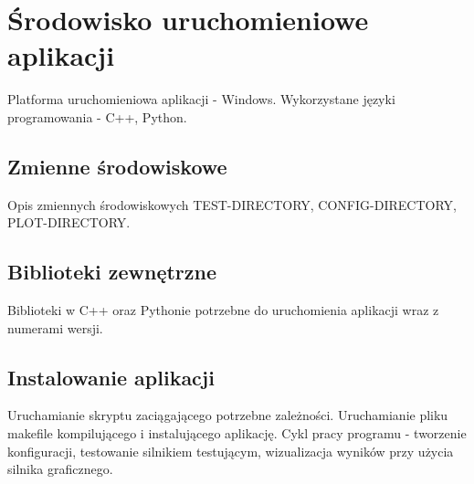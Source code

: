 \chapter{Środowisko uruchomieniowe aplikacji}
\thispagestyle{chapterBeginStyle}
Platforma uruchomieniowa aplikacji - Windows. Wykorzystane języki programowania - C++, Python.

\section{Zmienne środowiskowe}
Opis zmiennych środowiskowych TEST-DIRECTORY, CONFIG-DIRECTORY, PLOT-DIRECTORY.


\section{Biblioteki zewnętrzne}
Biblioteki w C++ oraz Pythonie potrzebne do uruchomienia aplikacji wraz z numerami wersji.

\section{Instalowanie aplikacji}
Uruchamianie skryptu zaciągającego potrzebne zależności.
Uruchamianie pliku makefile kompilującego i instalującego aplikację.
Cykl pracy programu - tworzenie konfiguracji, testowanie silnikiem testującym, wizualizacja wyników przy użycia
silnika graficznego.